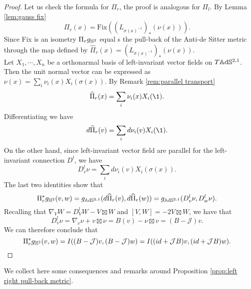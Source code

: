 \begin{proof}
    Let us check the formula for $\Pi_r$, the proof is analogous for $\Pi_l$. By Lemma \ref{lem:gauss fix}
    \[
        \Pi_r(x) = \text{Fix}((L_{\sigma(x)^{-1}})_*(\nu(x))).
    \]
    Since Fix is an isometry $\Pi_r g_{\mathbb{H}^2}$ equal s the pull-back of the Anti-de Sitter metric through the map defined by $\widehat{\Pi}_r(x) = (L_{\sigma(x)^{-1}})_*(\nu(x))$.\\
    Let $X_1, \cdots, X_n$ be a orthonarmal basis of left-invariant vector fields on $T\mathbb{A}\mathrm{d}\mathbb{S}^{2,1}$. Then the unit normal vector can be expressed as $\nu(x) = \sum_i \nu_i(x) X_i (\sigma(x))$. By Remark \ref{rem:parallel transport}
    \[
        \widehat{\Pi}_r(x) = \sum_i \nu_i(x) X_i (\1).
    \]
    Differentiating we have
    \[
        d \widehat{\Pi}_r(v) = \sum_i  d \nu_i(v) X_i (\1).
    \]
    On the other hand, since left-invariant vector field are parallel for the left-invariant connection $D^l$, we have
    \[
        D^l_v \nu = \sum_i  d \nu_i(v) X_i (\sigma(x)).
    \]
    The last two identities show that
    \[
        \Pi_r^* g_{\mathbb{H}^2}(v,w) = g_{\mathbb{A}\mathrm{d}\mathbb{S}^{2,1}}(d \widehat{\Pi}_r(v),d \widehat{\Pi}_r(w)) = g_{\mathbb{A}\mathrm{d}\mathbb{S}^{2,1}} (D^l_v \nu, D^l_w \nu).
    \]
    Recalling that $\nabla_V W = D^l_V W - V \boxtimes W$ and $\left[ V,W \right] = -2 V \boxtimes W$, we have that
    \[
        D^l_v \nu = \nabla_v \nu + v \boxtimes \nu = B(v) - \nu \boxtimes v = (B- \mathcal{J})v.
    \]
    We can therefore conclude that
    \[
        \Pi_r^* g_{\mathbb{H}^2}(v,w) = I ((B - \mathcal{J})v, (B - \mathcal{J})w) = I((id + \mathcal{J}B)v, (id + \mathcal{J}B)w).
    \]
\end{proof}
We collect here some consequences and remarks around Proposition \ref{prop:left right pull-back metric}.
